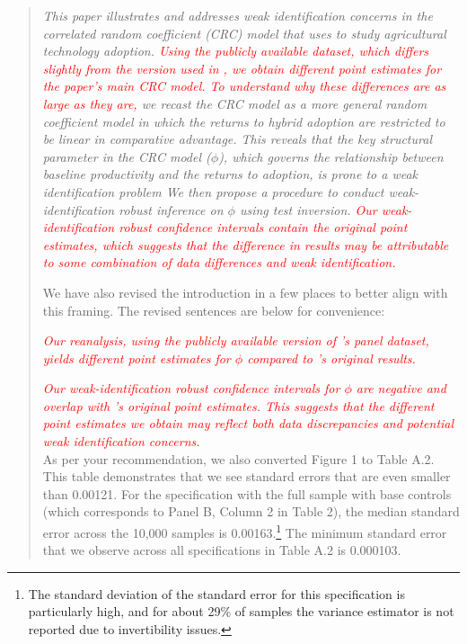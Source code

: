 \documentclass{article}[11pt]
\begin{document}
\begin{enumerate}
\begin{quote}
    \emph{This paper illustrates and addresses weak identification concerns in the correlated random coefficient (CRC) model that \citet{S2011} uses to study agricultural technology adoption.
    \textcolor{red}{Using the publicly available  dataset, which differs slightly from the version used in \citet{S2011}, we obtain different point estimates for the paper's main CRC model.
    To understand why these differences are as large as they are,} we recast the CRC model as a more general random coefficient model in which the returns to hybrid adoption are restricted to be linear in comparative advantage.
    This reveals that the key structural parameter in the CRC model ($\phi$), which governs the relationship between baseline productivity and the returns to adoption, is prone to a weak identification problem We then propose a procedure to conduct weak-identification robust inference on $\phi$ using test inversion.
   \textcolor{red}{Our weak-identification robust confidence intervals contain the original \citet{S2011} point estimates, which suggests that the difference in results may be attributable to some combination of data differences and weak identification.}}

    We have also revised the introduction in a few places to better align with this framing. The revised sentences are below for convenience:

    \emph{\textcolor{red}{Our reanalysis, using the publicly available version of \citet{S2011}'s panel dataset, yields different point estimates for $\phi$ compared to \citet{S2011}'s original results.}}

    \emph{\textcolor{red}{Our weak-identification robust confidence intervals for $\phi$ are negative and overlap with \citet{S2011}'s original point estimates. 
    This suggests that the different point estimates we obtain may reflect both data discrepancies and potential weak identification concerns.}}\\

    As per your recommendation, we also converted Figure 1 to Table A.2. This table demonstrates that we see standard errors that are even smaller than 0.00121. For the specification with the full sample with base controls (which corresponds to Panel B, Column 2 in Table 2), the median standard error across the 10,000 samples is 0.00163.\footnote{The standard deviation of the standard error for this specification is particularly high, and for about 29\% of samples the variance estimator is not reported due to invertibility issues.} The minimum standard error that we observe across all specifications in Table A.2 is 0.000103. 
\end{quote}


\end{enumerate}
\end{document}
